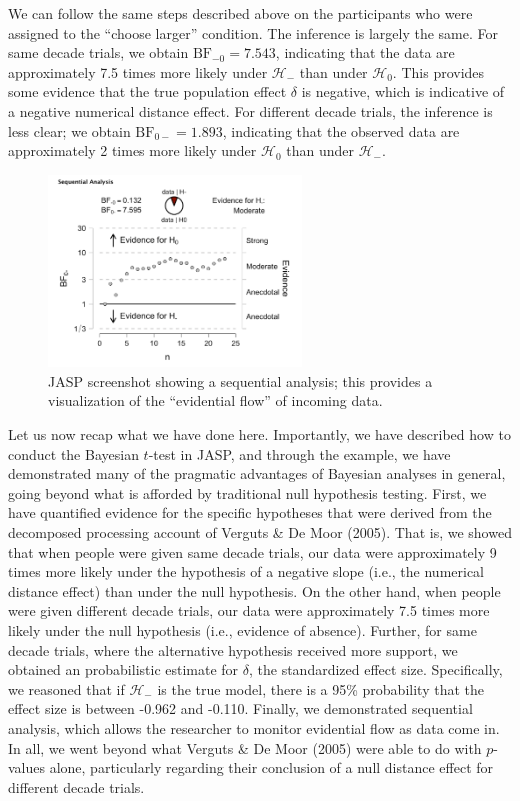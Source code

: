 \documentclass[english,,doc,floatsintext]{apa6}
\begin{document}
We can follow the same steps described above on the participants who were assigned to the \enquote{choose larger} condition. The inference is largely the same. For same decade trials, we obtain \(\text{BF}_{-0}=7.543\), indicating that the data are approximately 7.5 times more likely under \(\mathcal{H}_{-}\) than under \(\mathcal{H}_{0}\). This provides some evidence that the true population effect \(\delta\) is negative, which is indicative of a negative numerical distance effect. For different decade trials, the inference is less clear; we obtain \(\text{BF}_{0-}=1.893\), indicating that the observed data are approximately 2 times more likely under \(\mathcal{H}_{0}\) than under \(\mathcal{H}_{-}\).

\begin{figure}
\centering
\includegraphics[width=0.6\textwidth,height=\textheight]{figures/ttestSequential.png}
\caption{\label{fig:ttestSequential}JASP screenshot showing a sequential analysis; this provides a visualization of the \enquote{evidential flow} of incoming data.}
\end{figure}

Let us now recap what we have done here. Importantly, we have described how to conduct the Bayesian \(t\)-test in JASP, and through the example, we have demonstrated many of the pragmatic advantages of Bayesian analyses in general, going beyond what is afforded by traditional null hypothesis testing. First, we have quantified evidence for the specific hypotheses that were derived from the decomposed processing account of Verguts \& De Moor (2005). That is, we showed that when people were given same decade trials, our data were approximately 9 times more likely under the hypothesis of a negative slope (i.e., the numerical distance effect) than under the null hypothesis. On the other hand, when people were given different decade trials, our data were approximately 7.5 times more likely under the null hypothesis (i.e., evidence of absence). Further, for same decade trials, where the alternative hypothesis received more support, we obtained an probabilistic estimate for \(\delta\), the standardized effect size. Specifically, we reasoned that if \(\mathcal{H}_-\) is the true model, there is a 95\% probability that the effect size is between -0.962 and -0.110. Finally, we demonstrated sequential analysis, which allows the researcher to monitor evidential flow as data come in. In all, we went beyond what Verguts \& De Moor (2005) were able to do with \(p\)-values alone, particularly regarding their conclusion of a null distance effect for different decade trials.
\end{document}
